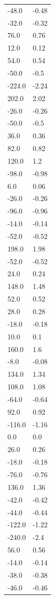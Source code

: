 \begin{longtable}{ll}
-48.0 & -0.48 \\
-32.0 & -0.32 \\
76.0 & 0.76 \\
12.0 & 0.12 \\
54.0 & 0.54 \\
-50.0 & -0.5 \\
-224.0 & -2.24 \\
202.0 & 2.02 \\
-26.0 & -0.26 \\
-50.0 & -0.5 \\
36.0 & 0.36 \\
82.0 & 0.82 \\
120.0 & 1.2 \\
-98.0 & -0.98 \\
6.0 & 0.06 \\
-26.0 & -0.26 \\
-96.0 & -0.96 \\
-14.0 & -0.14 \\
-52.0 & -0.52 \\
198.0 & 1.98 \\
-52.0 & -0.52 \\
24.0 & 0.24 \\
148.0 & 1.48 \\
52.0 & 0.52 \\
28.0 & 0.28 \\
-18.0 & -0.18 \\
10.0 & 0.1 \\
160.0 & 1.6 \\
-8.0 & -0.08 \\
134.0 & 1.34 \\
108.0 & 1.08 \\
-64.0 & -0.64 \\
92.0 & 0.92 \\
-116.0 & -1.16 \\
0.0 & 0.0 \\
26.0 & 0.26 \\
-18.0 & -0.18 \\
-76.0 & -0.76 \\
136.0 & 1.36 \\
-42.0 & -0.42 \\
-44.0 & -0.44 \\
-122.0 & -1.22 \\
-240.0 & -2.4 \\
56.0 & 0.56 \\
-14.0 & -0.14 \\
-38.0 & -0.38 \\
-46.0 & -0.46 \\

\end{longtable}
